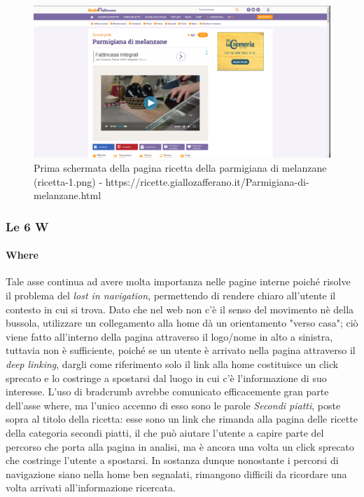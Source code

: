 \begin{figure}[h!]
	\centerline{
	\includegraphics[scale=0.2]{images/ricetta-1.png}}
	\caption{Prima schermata della pagina ricetta della parmigiana di melanzane (ricetta-1.png) - \newline https://ricette.giallozafferano.it/Parmigiana-di-melanzane.html}
	\label{fig:ricetta-1}
\end{figure}

\newpage

\subsubsection{Le 6 W}

\paragraph{Where} 
Tale asse continua ad avere molta importanza nelle pagine interne poiché risolve il problema del \textit{lost in navigation}, permettendo di rendere chiaro all'utente il contesto in cui si trova. Dato che nel web non c'è il senso del movimento nè della bussola, utilizzare un collegamento alla home dà un orientamento "verso casa"; ciò viene fatto all'interno della pagina attraverso il logo/nome in alto a sinistra, tuttavia non è sufficiente, poiché se un utente è arrivato nella pagina attraverso il \textit{deep linking}, dargli come riferimento solo il link alla home costituisce un click sprecato e lo costringe a spostarsi dal luogo in cui c'è l'informazione di suo interesse. 
L'uso di bradcrumb avrebbe comunicato efficacemente gran parte dell'asse where, ma l'unico accenno di esso sono le parole \textit{Secondi piatti}, poste sopra al titolo della ricetta: esse sono un link che rimanda alla pagina delle ricette della categoria secondi piatti, il che può aiutare l'utente a capire parte del percorso che porta alla pagina in analisi, ma è ancora una volta un click sprecato che costringe l'utente a spostarsi.
In sostanza dunque nonostante i percorsi di navigazione siano nella home ben segnalati, rimangono difficili da ricordare una volta arrivati all'informazione ricercata.

